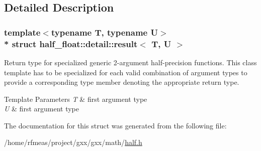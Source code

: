 \subsection{Detailed Description}
\subsubsection*{template$<$typename T, typename U$>$\\*
struct half\+\_\+float\+::detail\+::result$<$ T, U $>$}

Return type for specialized generic 2-\/argument half-\/precision functions. This class template has to be specialized for each valid combination of argument types to provide a corresponding {\ttfamily type} member denoting the appropriate return type. 
\begin{DoxyTemplParams}{Template Parameters}
{\em T} & first argument type \\
\hline
{\em U} & first argument type \\
\hline
\end{DoxyTemplParams}


The documentation for this struct was generated from the following file\+:\begin{DoxyCompactItemize}
\item 
/home/rfmeas/project/gxx/gxx/math/\hyperlink{half_8h}{half.\+h}\end{DoxyCompactItemize}
